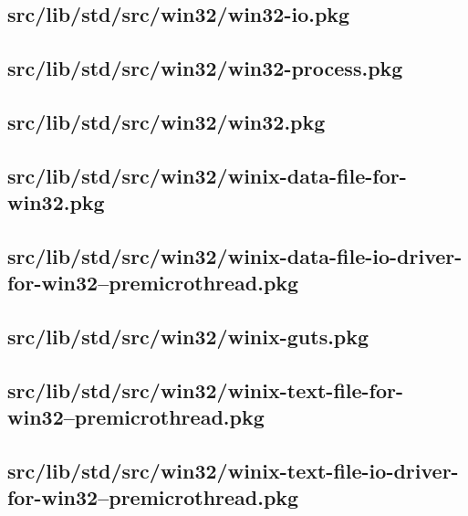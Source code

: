 \subsection{src/lib/std/src/win32/win32-io.pkg}


\subsection{src/lib/std/src/win32/win32-process.pkg}


\subsection{src/lib/std/src/win32/win32.pkg}


\subsection{src/lib/std/src/win32/winix-data-file-for-win32.pkg}


\subsection{src/lib/std/src/win32/winix-data-file-io-driver-for-win32--premicrothread.pkg}


\subsection{src/lib/std/src/win32/winix-guts.pkg}


\subsection{src/lib/std/src/win32/winix-text-file-for-win32--premicrothread.pkg}


\subsection{src/lib/std/src/win32/winix-text-file-io-driver-for-win32--premicrothread.pkg}


